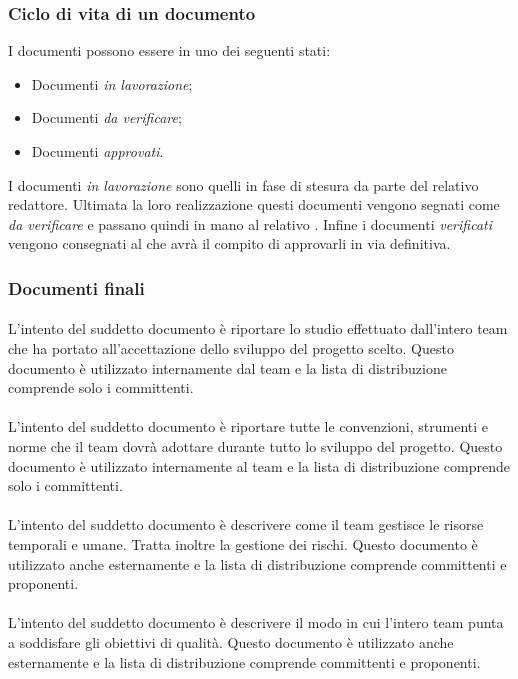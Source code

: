 \subsubsection{Ciclo di vita di un documento}
 I documenti possono essere in uno dei seguenti stati:
\begin{itemize}
  \item Documenti \textit{in lavorazione};
  \item Documenti \textit{da verificare};
  \item Documenti \textit{approvati}.
\end{itemize}
I documenti \textit{in lavorazione} sono quelli in fase di stesura da parte del 
relativo redattore. Ultimata la loro realizzazione questi documenti vengono 
segnati come \textit{da verificare} e passano quindi in mano al relativo 
\textit{\Ver}. Infine i documenti \textit{verificati} vengono consegnati al \textit{\RdP} 
che avrà il compito di approvarli in via definitiva.
\subsubsection{Documenti finali}
\paragraph{\SdF}
L'intento del suddetto documento è riportare lo studio effettuato dall'intero 
team che ha portato all'accettazione dello sviluppo del progetto scelto. Questo 
documento è utilizzato internamente dal team e la lista di distribuzione comprende solo i 
committenti.
\paragraph{\NdP}
L'intento del suddetto documento è riportare tutte le convenzioni, strumenti e 
norme che il team dovrà adottare durante tutto lo sviluppo del progetto. Questo 
documento è utilizzato internamente al team e la lista di distribuzione comprende solo i committenti. 
\paragraph{\PdP}
L'intento del suddetto documento è descrivere come il team gestisce le risorse 
temporali e umane. Tratta inoltre la gestione dei rischi. Questo documento è 
utilizzato anche esternamente e la lista di distribuzione comprende committenti 
e proponenti.
\paragraph{\PdQ}
L'intento del suddetto documento è descrivere il modo in cui l'intero team punta 
a soddisfare gli obiettivi di qualità. Questo documento è 
utilizzato anche esternamente e la lista di distribuzione comprende committenti 
e proponenti.
